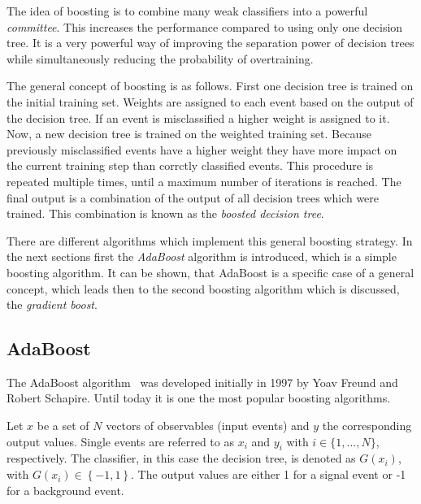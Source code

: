 The idea of boosting is to combine many weak classifiers into a powerful \emph{committee}.
This increases the performance compared to using only one decision tree.
It is a very powerful way of improving the separation power of decision trees while
simultaneously reducing the probability of overtraining.

The general concept of boosting is as follows.
First one decision tree is trained on the initial training set.
Weights are assigned to each event based on the output of the decision tree.
If an event is misclassified a higher weight is assigned to it.
Now, a new decision tree is trained on the weighted training set.
Because previously misclassified events have a higher weight they have more impact on the current training step
than corrctly classified events.
This procedure is repeated multiple times, until a maximum number of iterations is reached.
The final output is a combination of the output of all decision trees which were trained.
This combination is known as the \emph{boosted decision tree}.

There are different algorithms which implement this general boosting strategy.
In the next sections first the \emph{AdaBoost} algorithm is introduced, which is a simple boosting algorithm.
It can be shown, that AdaBoost is a specific case of a general concept, which leads then to the second
boosting algorithm which is discussed, the \emph{gradient boost}.

\subsection{AdaBoost}\label{sub:bdt:boosting:adaboost}

The AdaBoost algorithm~\cite{AdaBoost} was developed initially in 1997 by Yoav Freund and Robert Schapire.
Until today it is one the most popular boosting algorithms.

Let $x$ be a set of $N$ vectors of observables (input events) and $y$ the corresponding output values.
Single events are referred to as $x_i$ and $y_i$ with $i \in \{1, \ldots, N\}$, respectively.
The classifier, in this case the decision tree, is denoted as $G(x_i)$, with $G(x_i) \in \left\{ -1,1 \right\}$.
The output values are either 1 for a signal event or -1 for a background event.

